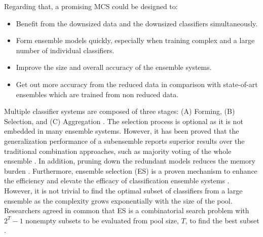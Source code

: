\noindent Regarding that, a promising MCS could be designed to: 
\begin{itemize} [nosep]
    \item Benefit from the downsized data and the downsized classifiers simultaneously.
    \item Form ensemble models quickly, especially when training complex and a large number of individual classifiers.
    \item Improve the size and overall accuracy of the ensemble systems.
    \item Get out more accuracy from the reduced data in comparison with state-of-art ensembles which are trained from non reduced data.
\end{itemize}

Multiple classifier systems are composed of three stages: (A) Forming, (B) Selection, and (C) Aggregation \cite{cruz2018}. The selection process is optional as it is not embedded in many ensemble systems. However, it has been proved that the generalization performance of a subensemble reports superior results over the traditional combination approaches, such as majority voting of the whole ensemble \cite{martinez2009,zhou2002}.
In addition, pruning down the redundant models reduces the memory burden \cite{diao2013}. Furthermore, ensemble selection (ES) is a proven mechanism to enhance the efficiency and elevate the efficacy of classification ensemble systems \cite{cao2018,martinez2009,guo2013, lu2010}.  However, it is not trivial to find the optimal subset of classifiers from a large ensemble as the complexity grows exponentially with the size of the pool. Researchers agreed in common that ES is a combinatorial search problem with $2^{T}-1$ nonempty subsets to be evaluated from pool size, $T$, to find the best subset \cite{tamon2000, tsoumakas2009}. 


